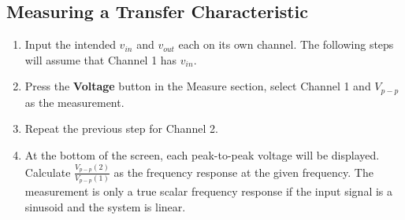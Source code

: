 \documentclass{article}
\begin{document}
\subsection{Measuring a Transfer Characteristic}
\begin{enumerate}
\item Input the intended $v_{in}$ and $v_{out}$ each on its own channel. The following steps will assume that Channel 1 has $v_{in}$.
\item Press the \textbf{Voltage} button in the Measure section, select Channel 1 and $V_{p-p}$ as the measurement.
\item Repeat the previous step for Channel 2.
\item At the bottom of the screen, each peak-to-peak voltage will be displayed. Calculate $\frac{V_{p-p}(2)}{V_{p-p}(1)}$ as the frequency response at the given frequency. The measurement is only a true scalar frequency response if the input signal is a sinusoid and the system is linear.
\end{enumerate}
\end{document}
